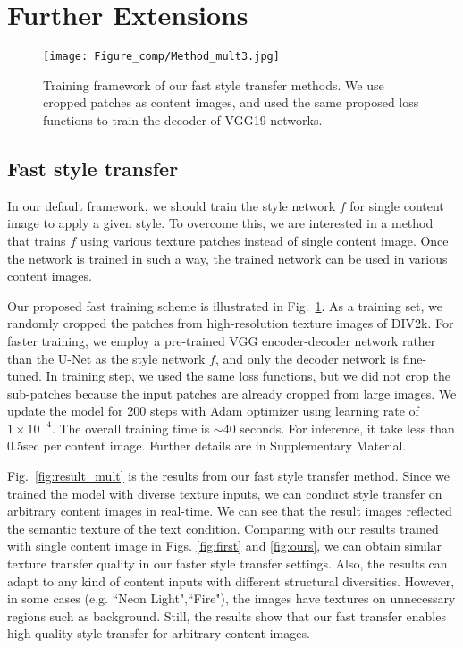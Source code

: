 \documentclass[10pt,twocolumn,letterpaper]{article}
\begin{document}
 


\section{Further Extensions}

\begin{figure}[!t]
\centering
    \vspace*{-0.5cm}
  \texttt{[image: Figure\_comp/Method\_mult3.jpg]}
  \vspace*{-0.5cm}
\caption{Training framework of our fast style transfer methods. We use cropped patches as content images, and used the same proposed loss functions to train the decoder of VGG19 networks.}
\vspace*{-0.5cm}
\label{fig:method_mult}
\end{figure}

\subsection{Fast style transfer}
In our default framework, we should train the style network $f$ for single content image to apply a given style. To overcome this, we are interested in a method that trains $f$ using various texture patches instead of single content image. Once the network is trained in such a way, the trained network can be used in various content images. 

Our proposed fast training scheme is illustrated in Fig.~\ref{fig:method_mult}. As a training set, we randomly cropped the patches from high-resolution texture images of DIV2k\cite{div2k}. For faster training, we employ   a pre-trained VGG encoder-decoder network rather than the U-Net as the style network $f$, and only the decoder network is fine-tuned. In training step, we used the same loss functions, but we did not crop the sub-patches because the input patches are already cropped from large images. We update the model for 200 steps with Adam optimizer using learning rate of $1\times10^{-4}$. The overall training time is $\sim$40 seconds. For inference, it take less than 0.5sec per content image. Further details are in  Supplementary Material.



Fig.~\ref{fig:result_mult} is the results from our fast style transfer method. Since we trained the model with diverse texture inputs, we can conduct style transfer on arbitrary content images in real-time.  We can see that the result images reflected the semantic texture of the text condition. Comparing with our results trained with single content image in Figs. \ref{fig:first} and \ref{fig:ours}, we can obtain similar texture transfer quality in our faster style transfer settings. Also, the results can adapt to any kind of content inputs with different structural diversities. However, in some cases (e.g. ``Neon Light",``Fire"), the images have textures on unnecessary regions such as background.  Still, the results show that our fast transfer enables high-quality style transfer for arbitrary content images.
\end{document}
